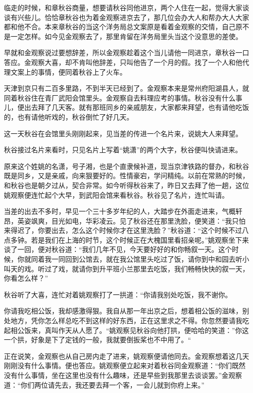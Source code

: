 \documentclass[12pt,UTF8]{ctexbook}
\begin{document}
{{{临走的时候，和章秋谷商量，想要请秋谷同他进京，两个人住在一起，觉得大家谈谈有兴些儿。恰恰章秋谷也为着金观察进京去了，那几位会办大人和帮办大人大家都和他不合。本来章秋谷的当这个洋务局总文案原是看着金观察的交情，自己原不是一定怎样。如今见金观察去了，那里肯留在洋务局里头当这个没意思的差使。

早就和金观察说过要想辞差，所以金观察趁着这个当儿请他一同进京，章秋谷一口答应。金观察大喜，却不肯叫他辞差，只叫他告了一个月的假。找了一个人和他代理文案上的事情，便同着秋谷上了火车。

天津到京只有二百多里路，不到半天已经到了。金观察本来是常州府阳湖县人，就同着秋谷住在青厂武阳会馆里头。金观察自去料理应考的事情。秋谷没有什么事儿，便出去拜了几天客。就有那班同乡的亲戚朋友，大家都来拜望，也有请他吃饭的，也有请他听戏的，秋谷倒忙了好几天。

这一天秋谷在会馆里头刚刚起来，见当差的传进一个名片来，说姚大人来拜望。

秋谷接过名片来看时，只见名片上写着“姚潇”的两个大字，秋谷便叫快请进来。

原来这个姓姚的名潇，号子湘，也是个直隶候补道，现当京津铁路的督办，和秋谷既是同乡，又是亲戚，向来狠要好的。性情豪宕，学问精纯。以前在常熟的时候，和秋谷也是朝夕过从，契合非常。如今听得秋谷来了，昨日又去拜了他一趟，这位姚观察便连忙起个大早，到武阳会馆来看秋谷。秋谷见了名片，连忙叫请。

当差的出去不多时，早见一个三十多岁年纪的人，大踏步在外面走进来，气概轩昂，英姿飒爽，目光如电，华彩凌云。见了秋谷还在那里洗脸，便笑道：“我只怕来得迟了，你要出去，怎么这个时候你才在这里洗脸？”秋谷道：“这个时候不过八点多钟。若是我们在上海的时节，这个时候正在大槐国里看招亲呢。”姚观察坐下来谈了一回，便对秋谷道：“我们几年不见，今天要好好的和你畅叙一天。这个时候，你就同着我一同回到公馆去，就在我公馆里头吃过了饭，请你到中和园去听小叫天的戏。听过了戏，就请你到升平班小兰那里去吃饭，我们畅畅快快的叙一天，你看怎么样？”

秋谷听了大喜，连忙对着姚观察打了一拱道：“你请我别处吃饭，我不谢你。

你请我吃相公饭，我却感激得狠。我自从那一年出京之后，想着相公饭的滋味，别处地方，凭你怎么样总吃不到这样的好东西，正在这里求之不得。你忽然要请我吃起相公饭来，真叫作天从人愿了。“姚观察见秋谷向他打拱，便哈哈的笑道：”你这一个拱，好象是下了定钱的一般，我就要倒扳桨也不中用了。“

正在说笑，金观察也从自己房内走了进来，姚观察便请他同去。金观察想着这几天刚刚没有什么事情。便也答应。姚观察便立起来对着秋谷同金观察道：“你们既然没有什么事情，坐在这里也没有什么趣味，还是早些到我那里去谈谈罢。”金观察道：“你们两位请先去，我还要去拜一个客，一会儿就到你府上来。”

}}}
\end{document}
